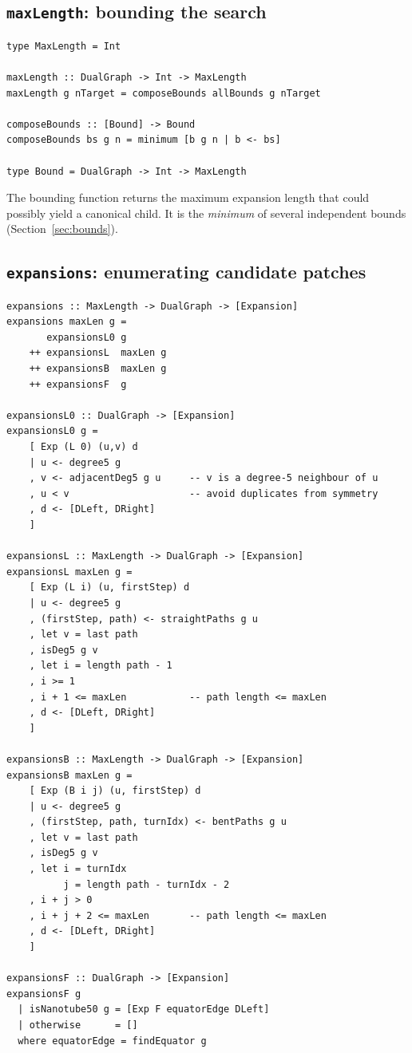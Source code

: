 \documentclass[11pt,a4paper]{article}
\theoremstyle{definition}
\begin{document}
\subsection{\texttt{maxLength}: bounding the search}

\begin{lstlisting}
type MaxLength = Int

maxLength :: DualGraph -> Int -> MaxLength
maxLength g nTarget = composeBounds allBounds g nTarget

composeBounds :: [Bound] -> Bound
composeBounds bs g n = minimum [b g n | b <- bs]

type Bound = DualGraph -> Int -> MaxLength
\end{lstlisting}

The bounding function returns the maximum expansion length that could
possibly yield a canonical child.  It is the \emph{minimum} of several
independent bounds (Section~\ref{sec:bounds}).

\subsection{\texttt{expansions}: enumerating candidate patches}

\begin{lstlisting}
expansions :: MaxLength -> DualGraph -> [Expansion]
expansions maxLen g =
       expansionsL0 g
    ++ expansionsL  maxLen g
    ++ expansionsB  maxLen g
    ++ expansionsF  g

expansionsL0 :: DualGraph -> [Expansion]
expansionsL0 g =
    [ Exp (L 0) (u,v) d
    | u <- degree5 g
    , v <- adjacentDeg5 g u     -- v is a degree-5 neighbour of u
    , u < v                     -- avoid duplicates from symmetry
    , d <- [DLeft, DRight]
    ]

expansionsL :: MaxLength -> DualGraph -> [Expansion]
expansionsL maxLen g =
    [ Exp (L i) (u, firstStep) d
    | u <- degree5 g
    , (firstStep, path) <- straightPaths g u
    , let v = last path
    , isDeg5 g v
    , let i = length path - 1
    , i >= 1
    , i + 1 <= maxLen           -- path length <= maxLen
    , d <- [DLeft, DRight]
    ]

expansionsB :: MaxLength -> DualGraph -> [Expansion]
expansionsB maxLen g =
    [ Exp (B i j) (u, firstStep) d
    | u <- degree5 g
    , (firstStep, path, turnIdx) <- bentPaths g u
    , let v = last path
    , isDeg5 g v
    , let i = turnIdx
          j = length path - turnIdx - 2
    , i + j > 0
    , i + j + 2 <= maxLen       -- path length <= maxLen
    , d <- [DLeft, DRight]
    ]

expansionsF :: DualGraph -> [Expansion]
expansionsF g
  | isNanotube50 g = [Exp F equatorEdge DLeft]
  | otherwise      = []
  where equatorEdge = findEquator g
\end{lstlisting}
\end{document}
